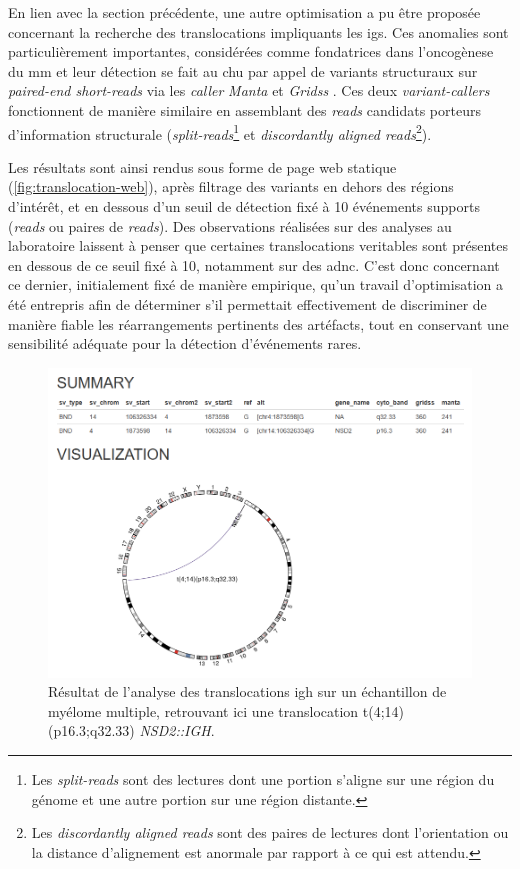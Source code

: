 En lien avec la section précédente, une autre optimisation a pu être proposée
concernant la recherche des translocations impliquants les \glspl{ig}. Ces
anomalies sont particulièrement importantes, considérées comme fondatrices dans
l'oncogènese du \gls{mm} et leur détection se fait au \gls{chu} par appel de
variants structuraux sur \textit{paired-end short-reads} via les
\textit{caller} \textit{Manta} \cite{chenMantaRapidDetection2016a} et
\textit{Gridss} \cite{cameronGRIDSSSensitiveSpecific2017a}. Ces deux
\textit{variant-callers} fonctionnent de manière similaire en assemblant des
\textit{reads} candidats porteurs d'information structurale
(\textit{split-reads}\footnote{Les \textit{split-reads} sont des lectures dont
une portion s'aligne sur une région du génome et une autre portion sur une
région distante.} et \textit{discordantly aligned reads}\footnote{Les
\textit{discordantly aligned reads} sont des paires de lectures dont
l'orientation ou la distance d'alignement est anormale par rapport à ce qui est
attendu.}).

\vspace{1em}

Les résultats sont ainsi rendus sous forme de page web statique
(\autoref{fig:translocation-web}), après filtrage des variants en dehors des
régions d'intérêt, et en dessous d'un seuil de détection fixé à 10 événements
supports (\textit{reads} ou paires de \textit{reads}). Des observations
réalisées sur des analyses au laboratoire laissent à penser que certaines
translocations veritables sont présentes en dessous de ce seuil fixé à 10,
notamment sur des \gls{adnc}. C'est donc concernant ce dernier, initialement
fixé de manière empirique, qu'un travail d'optimisation a été entrepris afin de
déterminer s'il permettait effectivement de discriminer de manière fiable les
réarrangements pertinents des artéfacts, tout en conservant une sensibilité
adéquate pour la détection d'événements rares.

\begin{figure}[H]
    \centering
    \includegraphics[width=1\textwidth]{images/translocation_web.png}
    \caption{
        Résultat de l'analyse des translocations \gls{igh} sur un échantillon de myélome multiple,
        retrouvant ici une translocation t(4;14)(p16.3;q32.33) \textit{NSD2::IGH}.
    }
    \label{fig:translocation-web}
\end{figure}

